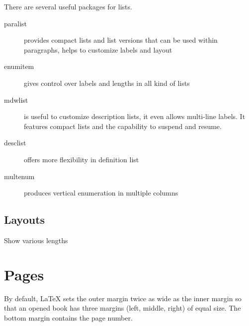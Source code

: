 \documentclass[a4paper,12pt]{article}
\begin{document}
There are several useful packages for lists.

\begin{description}
  \item[paralist] provides compact lists and list versions that
can be used within paragraphs, helps to customize labels and
layout
\item[enumitem] gives control over labels and lengths
in all kind of lists
\item[mdwlist] is useful to customize description lists, it
even allows multi-line labels. It features compact lists and
the capability to suspend and resume.
\item[desclist] offers more flexibility in definition list
\item[multenum] produces vertical enumeration in multiple
columns
\end{description}

\subsection{Layouts}

Show various lengths

\listdiagram

\section{Pages}

By default, LaTeX sets the outer margin twice as wide as the inner margin so that an opened book has three margins (left, middle, right) of equal size. The bottom margin contains the page number.
\end{document}

